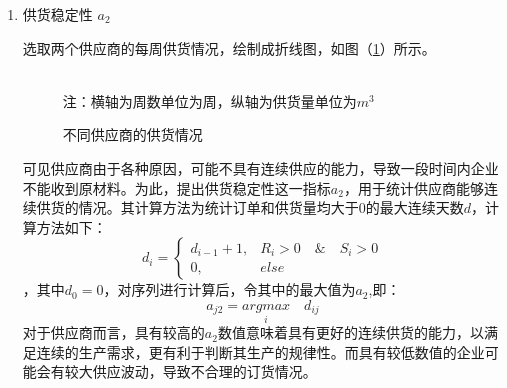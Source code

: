 \documentclass{my_paper}
\begin{document}
\begin{enumerate}
    \item 供货稳定性 $a_2$
    
    选取两个供应商的每周供货情况，绘制成折线图，如图（\ref{11}）所示。
    \begin{figure}[htbp]
        \centering  %
        \\
        注：横轴为周数单位为周，纵轴为供货量单位为$m^3$
    
        \caption{不同供应商的供货情况}    %
        \label{11}    %
    \end{figure}
    \newpage
    可见供应商由于各种原因，可能不具有连续供应的能力，导致一段时间内企业不能收到原材料。为此，提出供货稳定性这一指标$a_2$，用于统计供应商能够连续供货的情况。其计算方法为统计订单和供货量均大于0的最大连续天数$d$，计算方法如下：
    \begin{equation}
    d_i = \begin{cases}
        d_{i-1}+1,&R_i>0 \quad\&\quad S_i>0\\
        0, & else
    \end{cases}
    \label{d}
    \end{equation}
    ，其中$d_0=0$，对序列进行计算后，令其中的最大值为$a_2$,即：
    \begin{equation}
    a_{j2}=\underset{i}{argmax}\quad d_{ij}
    \label{aj2}
    \end{equation}
    对于供应商而言，具有较高的$a_2$数值意味着具有更好的连续供货的能力，以满足连续的生产需求，更有利于判断其生产的规律性。而具有较低数值的企业可能会有较大供应波动，导致不合理的订货情况。


\end{enumerate}
\end{document}
